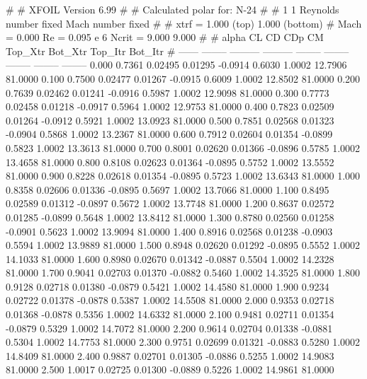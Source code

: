 #  
#       XFOIL         Version 6.99
#  
# Calculated polar for: N-24                                            
#  
# 1 1 Reynolds number fixed          Mach number fixed         
#  
# xtrf =   1.000 (top)        1.000 (bottom)  
# Mach =   0.000     Re =     0.095 e 6     Ncrit =   9.000  9.000
#  
#   alpha    CL        CD       CDp       CM     Top_Xtr  Bot_Xtr  Top_Itr  Bot_Itr
#  ------ -------- --------- --------- -------- -------- -------- -------- --------
   0.000   0.7361   0.02495   0.01295  -0.0914   0.6030   1.0002  12.7906  81.0000
   0.100   0.7500   0.02477   0.01267  -0.0915   0.6009   1.0002  12.8502  81.0000
   0.200   0.7639   0.02462   0.01241  -0.0916   0.5987   1.0002  12.9098  81.0000
   0.300   0.7773   0.02458   0.01218  -0.0917   0.5964   1.0002  12.9753  81.0000
   0.400   0.7823   0.02509   0.01264  -0.0912   0.5921   1.0002  13.0923  81.0000
   0.500   0.7851   0.02568   0.01323  -0.0904   0.5868   1.0002  13.2367  81.0000
   0.600   0.7912   0.02604   0.01354  -0.0899   0.5823   1.0002  13.3613  81.0000
   0.700   0.8001   0.02620   0.01366  -0.0896   0.5785   1.0002  13.4658  81.0000
   0.800   0.8108   0.02623   0.01364  -0.0895   0.5752   1.0002  13.5552  81.0000
   0.900   0.8228   0.02618   0.01354  -0.0895   0.5723   1.0002  13.6343  81.0000
   1.000   0.8358   0.02606   0.01336  -0.0895   0.5697   1.0002  13.7066  81.0000
   1.100   0.8495   0.02589   0.01312  -0.0897   0.5672   1.0002  13.7748  81.0000
   1.200   0.8637   0.02572   0.01285  -0.0899   0.5648   1.0002  13.8412  81.0000
   1.300   0.8780   0.02560   0.01258  -0.0901   0.5623   1.0002  13.9094  81.0000
   1.400   0.8916   0.02568   0.01238  -0.0903   0.5594   1.0002  13.9889  81.0000
   1.500   0.8948   0.02620   0.01292  -0.0895   0.5552   1.0002  14.1033  81.0000
   1.600   0.8980   0.02670   0.01342  -0.0887   0.5504   1.0002  14.2328  81.0000
   1.700   0.9041   0.02703   0.01370  -0.0882   0.5460   1.0002  14.3525  81.0000
   1.800   0.9128   0.02718   0.01380  -0.0879   0.5421   1.0002  14.4580  81.0000
   1.900   0.9234   0.02722   0.01378  -0.0878   0.5387   1.0002  14.5508  81.0000
   2.000   0.9353   0.02718   0.01368  -0.0878   0.5356   1.0002  14.6332  81.0000
   2.100   0.9481   0.02711   0.01354  -0.0879   0.5329   1.0002  14.7072  81.0000
   2.200   0.9614   0.02704   0.01338  -0.0881   0.5304   1.0002  14.7753  81.0000
   2.300   0.9751   0.02699   0.01321  -0.0883   0.5280   1.0002  14.8409  81.0000
   2.400   0.9887   0.02701   0.01305  -0.0886   0.5255   1.0002  14.9083  81.0000
   2.500   1.0017   0.02725   0.01300  -0.0889   0.5226   1.0002  14.9861  81.0000
